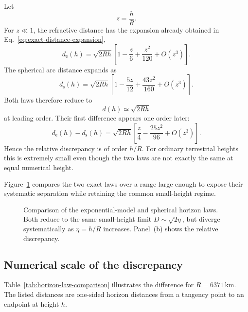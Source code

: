 Let
\begin{equation}
    z=\frac{h}{R}.
\end{equation}
For $z\ll 1$, the refractive distance has the expansion already obtained in
Eq.~\eqref{eq:exact-distance-expansion},
\begin{equation}
    d_{\mathrm{e}}(h)
    =
    \sqrt{2Rh}
    \left[
        1-\frac{z}{6}+\frac{z^2}{120}
        +O(z^3)
    \right].
    \label{eq:refractive-distance-small-height}
\end{equation}
The spherical arc distance expands as
\begin{equation}
    d_{\mathrm{s}}(h)
    =
    \sqrt{2Rh}
    \left[
        1-\frac{5z}{12}+\frac{43z^2}{160}
        +O(z^3)
    \right].
    \label{eq:spherical-distance-small-height}
\end{equation}
Both laws therefore reduce to
\begin{equation}
    d(h)\simeq\sqrt{2Rh}
\end{equation}
at leading order. Their first difference appears one order later:
\begin{equation}
    d_{\mathrm{e}}(h)-d_{\mathrm{s}}(h)
    =
    \sqrt{2Rh}
    \left[
        \frac{z}{4}
        -\frac{25z^2}{96}
        +O(z^3)
    \right].
    \label{eq:refractive-spherical-difference}
\end{equation}
Hence the relative discrepancy is of order $h/R$. For ordinary terrestrial
heights this is extremely small even though the two laws are not exactly the
same at equal numerical height.

Figure~\ref{fig:horizon-law-comparison} compares the two exact laws over a
range large enough to expose their systematic separation while retaining the
common small-height regime.

\begin{figure}[ht]
    \centering
    
    \caption{Comparison of the exponential-model and spherical horizon laws.
    Both reduce to the same small-height limit $D\sim\sqrt{2\eta}$, but
    diverge systematically as $\eta=h/R$ increases. Panel~(b) shows the
    relative discrepancy.}
    \label{fig:horizon-law-comparison}
\end{figure}

\subsection{Numerical scale of the discrepancy}

Table~\ref{tab:horizon-law-comparison} illustrates the difference for
$R=6371\,\mathrm{km}$. The listed distances are one-sided horizon distances
from a tangency point to an endpoint at height $h$.


